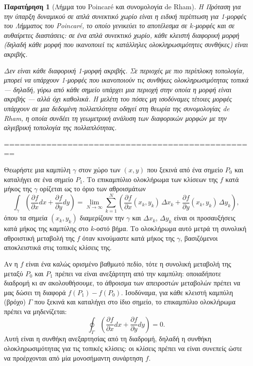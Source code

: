 \documentclass[11pt,a4paper,twoside,openright]{book}
\newtheorem{remark}[lemma]{Παρατήρηση}
\begin{document}
\begin{remark}[Λήμμα του Poincaré και συνομολογία de Rham]
Η Πρόταση για την ύπαρξη δυναμικού σε απλά συνεκτικό χωρίο είναι η ειδική περίπτωση για 1-μορφές του Λήμματος του Poincaré, το οποίο γενικεύει το αποτέλεσμα σε $k$-μορφές και σε αυθαίρετες διαστάσεις: σε ένα απλά συνεκτικό χωρίο, κάθε κλειστή διαφορική μορφή (δηλαδή κάθε μορφή που ικανοποιεί τις κατάλληλες ολοκληρωσιμότητες συνθήκες) είναι ακριβής.

Δεν είναι κάθε διαφορική 1-μορφή ακριβής. Σε περιοχές με πιο περίπλοκη τοπολογία, μπορεί να υπάρχουν 1-μορφές που ικανοποιούν τις συνθήκες ολοκληρωσιμότητας τοπικά --- δηλαδή, γύρω από κάθε σημείο υπάρχει μια περιοχή στην οποία η μορφή είναι ακριβής --- αλλά όχι καθολικά. Η μελέτη του πόσες μη ισοδύναμες τέτοιες μορφές υπάρχουν σε μια δεδομένη πολλαπλότητα οδηγεί στη θεωρία της συνομολογίας de Rham, η οποία συνδέει τη γεωμετρική ανάλυση των διαφορικών μορφών με την αλγεβρική τοπολογία της πολλαπλότητας.
\end{remark}

================================================

Θεωρήστε μια καμπύλη \(\gamma\) στον χώρο των \((x,y)\) που ξεκινά από ένα σημείο \(P_0\) και καταλήγει σε ένα σημείο \(P_1\). Το επικαμπύλιο ολοκλήρωμα των κλίσεων της \(f\) κατά μήκος της \(\gamma\) ορίζεται ως το όριο των αθροισμάτων
\begin{equation}
\int_\gamma \left( \frac{\partial f}{\partial x} dx + \frac{\partial f}{\partial y} dy \right) = \lim_{N \to \infty} \sum_{k=1}^{N} \left( \frac{\partial f}{\partial x}(x_k, y_k) \, \Delta x_k + \frac{\partial f}{\partial y}(x_k, y_k) \, \Delta y_k \right),
\end{equation}
όπου τα σημεία \((x_k, y_k)\) διαμερίζουν την \(\gamma\) και \(\Delta x_k\), \(\Delta y_k\) είναι οι προσαυξήσεις κατά μήκος της καμπύλης στο \(k\)-οστό βήμα. Το ολοκλήρωμα αυτό μετρά τη συνολική αθροιστική μεταβολή της \(f\) όταν κινούμαστε κατά μήκος της \(\gamma\), βασιζόμενοι αποκλειστικά στις τοπικές κλίσεις της.

Αν η \(f\) είναι ένα καλώς ορισμένο βαθμωτό πεδίο, τότε η συνολική μεταβολή της μεταξύ \(P_0\) και \(P_1\) πρέπει να είναι ανεξάρτητη από την καμπύλη: οποιαδήποτε διαδρομή κι αν ακολουθήσουμε, το άθροισμα των απειροστών μεταβολών πρέπει να μας δώσει τη διαφορά \(f(P_1) - f(P_0)\). Ισοδύναμα, για κάθε κλειστή καμπύλη (βρόχο) \(\Gamma\) που ξεκινά και καταλήγει στο ίδιο σημείο, το επικαμπύλιο ολοκλήρωμα πρέπει να μηδενίζεται:
\begin{equation}
\oint_\Gamma \left( \frac{\partial f}{\partial x} dx + \frac{\partial f}{\partial y} dy \right) = 0.
\end{equation}
Αυτή είναι η συνθήκη ανεξαρτησίας από τη διαδρομή, δηλαδή η συνθήκη ολοκληρωσιμότητας για τις τοπικές κλίσεις: οι κλίσεις πρέπει να είναι συνεπείς ώστε να προέρχονται από μία μονοσήμαντη συνάρτηση \(f\).
\end{document}
